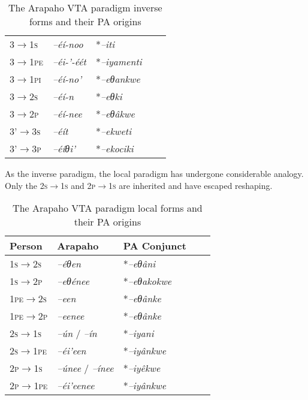 \documentclass[twoside,a4paper,11pt]{article}
\newcommand{\ipa}[1]{{\phon\textit{#1}}}
\newcommand{\grise}[1]{\cellcolor{lightgray}\textbf{#1}}
\newcommand{\Σ}{\greek{Σ}}
\begin{document}
\begin{table}[H]
\caption{The Arapaho VTA paradigm inverse forms and their PA origins}
\centering \label{tab:arapaho.vta.2}
\begin{tabular}{lllll}
\toprule
\textsc{3$\rightarrow$1s} & 	\ipa{--éí-noo}\grise{} & 	*\ipa{--iti} & 		\\
\textsc{3$\rightarrow$1pe} & 	\ipa{--éi-'-éét} \grise{}& *\ipa{--iyamenti} & 		\\
\textsc{3$\rightarrow$1pi} & 	\ipa{--éí-no'} \grise{}& 	*\ipa{--eθankwe} & 		\\
\midrule
\textsc{3$\rightarrow$2s} & 	\ipa{--éí-n} \grise{}& *\ipa{--eθki} & 		\\
\textsc{3$\rightarrow$2p} & 	\ipa{--éí-nee} \grise{}& *\ipa{--eθâkwe} & 		\\
\midrule
3'\textsc{$\rightarrow$3s} & 	\ipa{--éít} & 	*\ipa{--ekweti} & 		\\
3'\textsc{$\rightarrow$3p} & 	\ipa{--éíθi'} & 	*\ipa{--ekociki} & 		\\
\bottomrule
\end{tabular}
\end{table}

As the inverse paradigm, the local paradigm has undergone considerable analogy. Only the \textsc{2s$\rightarrow$1s} and \textsc{2p$\rightarrow$1s} are inherited and have escaped reshaping. 



\begin{table}[H]
\caption{The Arapaho VTA paradigm local forms and their PA origins}
\centering \label{tab:vta.3}
\begin{tabular}{lllll}
\toprule
Person & Arapaho & PA Conjunct    \\
\midrule 
\textsc{1s$\rightarrow$2s}& \ipa{--éθen} \grise{}& *\ipa{--eθâni}   \\
\textsc{1s$\rightarrow$2p}&\ipa{--eθénee} \grise{}& *\ipa{--eθakokwe} & \\
\textsc{1pe$\rightarrow$2s}&\ipa{--een} \grise{}& *\ipa{--eθânke} &   \\
\textsc{1pe$\rightarrow$2p}&\ipa{--eenee} \grise{}& *\ipa{--eθânke} &   \\
\midrule 
\textsc{2s$\rightarrow$1s}&\ipa{--ún} / \ipa{--ín} &   *\ipa{--iyani}     \\
\textsc{2s$\rightarrow$1pe}& \ipa{--éi'een}\grise{}& *\ipa{--iyânkwe} &  \\
\textsc{2p$\rightarrow$1s}&\ipa{--únee} / \ipa{--ínee} &  *\ipa{--iyêkwe} &   \\
\textsc{2p$\rightarrow$1pe}&\ipa{--éi'eenee}\grise{} & *\ipa{--iyânkwe} &   \\
\bottomrule
\end{tabular}
\end{table}
\end{document}
